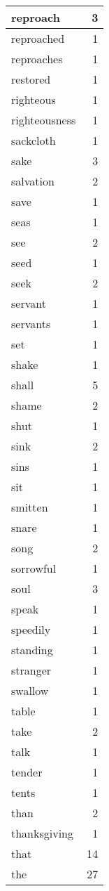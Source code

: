 \begin{center}
\begin{longtable}{l|r}
reproach & 3\\ \hline 
reproached & 1\\ \hline 
reproaches & 1\\ \hline 
restored & 1\\ \hline 
righteous & 1\\ \hline 
righteousness & 1\\ \hline 
sackcloth & 1\\ \hline 
sake & 3\\ \hline 
salvation & 2\\ \hline 
save & 1\\ \hline 
seas & 1\\ \hline 
see & 2\\ \hline 
seed & 1\\ \hline 
seek & 2\\ \hline 
servant & 1\\ \hline 
servants & 1\\ \hline 
set & 1\\ \hline 
shake & 1\\ \hline 
shall & 5\\ \hline 
shame & 2\\ \hline 
shut & 1\\ \hline 
sink & 2\\ \hline 
sins & 1\\ \hline 
sit & 1\\ \hline 
smitten & 1\\ \hline 
snare & 1\\ \hline 
song & 2\\ \hline 
sorrowful & 1\\ \hline 
soul & 3\\ \hline 
speak & 1\\ \hline 
speedily & 1\\ \hline 
standing & 1\\ \hline 
stranger & 1\\ \hline 
swallow & 1\\ \hline 
table & 1\\ \hline 
take & 2\\ \hline 
talk & 1\\ \hline 
tender & 1\\ \hline 
tents & 1\\ \hline 
than & 2\\ \hline 
thanksgiving & 1\\ \hline 
that & 14\\ \hline 
the & 27\\ \hline 

\end{longtable}
\end{center}
